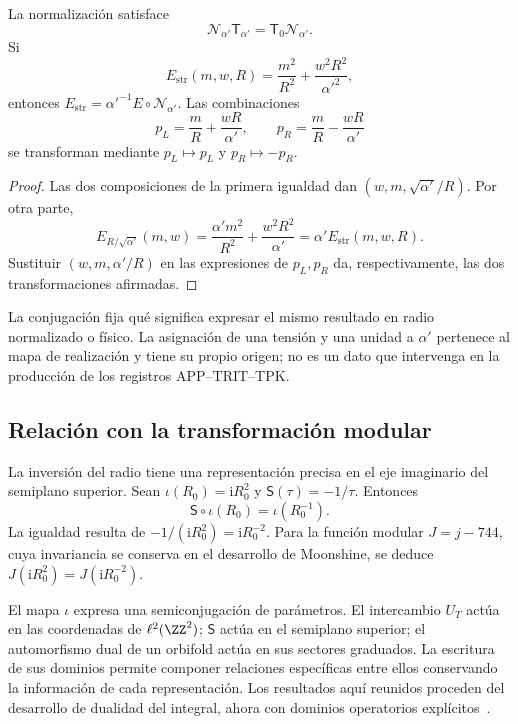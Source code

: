 \begin{theorem}
\label{iv:thm:normalizacion-cuerda}
La normalización satisface
\[
 \mathcal N_{\alpha'}\mathsf T_{\alpha'}
 =\mathsf T_0\mathcal N_{\alpha'}.
\]
Si
\[
 E_{\mathrm{str}}(m,w,R)
 =\frac{m^2}{R^2}+\frac{w^2R^2}{\alpha'^2},
\]
entonces
\(E_{\mathrm{str}}=\alpha'^{-1}E\circ\mathcal N_{\alpha'}\).
Las combinaciones
\[
 p_L=\frac mR+\frac{wR}{\alpha'},\qquad
 p_R=\frac mR-\frac{wR}{\alpha'}
\]
se transforman mediante \(p_L\mapsto p_L\) y \(p_R\mapsto-p_R\).
\end{theorem}
\begin{proof}
Las dos composiciones de la primera igualdad dan
\((w,m,\sqrt{\alpha'}/R)\). Por otra parte,
\[
 E_{R/\sqrt{\alpha'}}(m,w)
 =\frac{\alpha'm^2}{R^2}+\frac{w^2R^2}{\alpha'}
 =\alpha'E_{\mathrm{str}}(m,w,R).
\]
Sustituir \((w,m,\alpha'/R)\) en las expresiones de
\(p_L,p_R\) da, respectivamente, las dos transformaciones
afirmadas.
\end{proof}

La conjugación fija qué significa expresar el mismo resultado en
radio normalizado o físico. La asignación de una tensión y una
unidad a \(\alpha'\) pertenece al mapa de realización y tiene
su propio origen; no es un dato que intervenga en la producción
de los registros APP--TRIT--TPK.

\subsection{Relación con la transformación modular}

La inversión del radio tiene una representación precisa en el
eje imaginario del semiplano superior. Sean
\(\iota(R_0)=\mathrm iR_0^2\) y
\(\mathsf S(\tau)=-1/\tau\). Entonces
\begin{equation}
 \mathsf S\circ\iota(R_0)=\iota(R_0^{-1}).
 \label{iv:eq:semiconjugacion-modular}
\end{equation}
La igualdad resulta de
\(-1/(\mathrm iR_0^2)=\mathrm iR_0^{-2}\). Para la función
modular \(J=j-744\), cuya invariancia se conserva en el
desarrollo de Moonshine, se deduce
\(J(\mathrm iR_0^2)=J(\mathrm iR_0^{-2})\).

El mapa \(\iota\) expresa una semiconjugación de parámetros.
El intercambio \(U_T\) actúa en las coordenadas de
\(\ell^2(\ZZ^2)\); \(\mathsf S\) actúa en el semiplano
superior; el automorfismo dual de un orbifold actúa en sus
sectores graduados. La escritura de sus dominios permite
componer relaciones específicas entre ellos conservando la
información de cada representación. Los resultados aquí
reunidos proceden del desarrollo de dualidad del integral,
ahora con dominios operatorios explícitos~\cite{hmtedicionintegral}.
